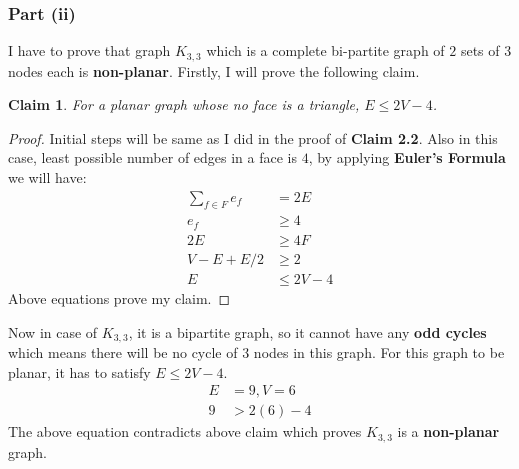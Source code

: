 \documentclass{article}
\let\bold\textbf
\newtheorem{claim}{Claim}[section]
\begin{document}
{{    \subsubsection{Part (ii)}{
      I have to prove that graph $K_{3,3}$ which is a complete bi-partite graph of $2$ sets of $3$ nodes each is \bold{non-planar}. \newline
      Firstly, I will prove the following claim.
      \begin{claim}
        For a planar graph whose no face is a triangle, $E \leq 2V-4$.
      \end{claim}
      \begin{proof}
        Initial steps will be same as I did in the proof of \bold{Claim 2.2}. \newline
        Also in this case, least possible number of edges in a face is $4$, by applying \bold{Euler's Formula} we will have:
        \begin{align*}
          \sum_{f \in F} e_f &= 2E \\
          e_f &\geq 4 \\
          2E &\geq 4F \\
          V - E + E/2 &\geq 2 \\
          E &\leq 2V-4
        \end{align*}
        Above equations prove my claim.
      \end{proof}
      Now in case of $K_{3,3}$, it is a bipartite graph, so it cannot have any \bold{odd cycles} which means there will be no cycle of $3$ nodes in this graph. \newline
      For this graph to be planar, it has to satisfy $E \leq 2V-4$.
      \begin{align*}
        E&=9,V=6 \\
        9 &> 2(6)-4 
      \end{align*}
      The above equation contradicts above claim which proves $K_{3,3}$ is a \bold{non-planar} graph.
    }
  }
}
\newpage
\end{document}
